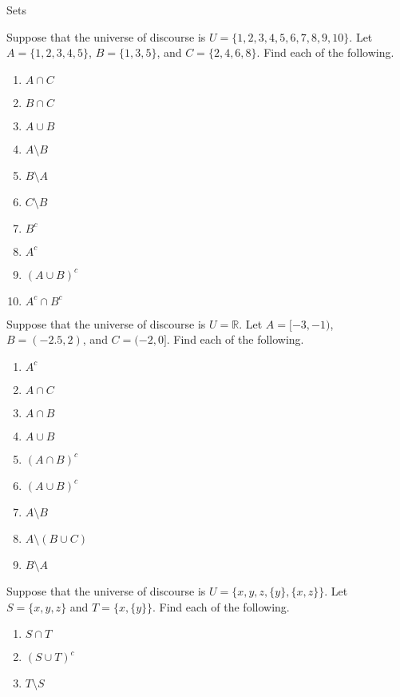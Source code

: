 \begin{section}{Sets}
\begin{problem}
Suppose that the universe of discourse is $U=\{1,2,3,4,5,6,7,8,9,10\}$.  Let $A=\{1, 2, 3, 4, 5\}$, $B=\{1, 3, 5\}$, and $C=\{2, 4, 6, 8\}$.  Find each of the following.
\begin{multicols}{2}
\begin{enumerate}[label=\textrm{(\alph*)}]
\item $A \cap C$
\item $B \cap C$
\item $A \cup B$
\item $A\setminus B$
\item $B \setminus A$
\item $C \setminus B$
\item $B^c$
\item $A^c$
\item $(A\cup B)^c$
\item $A^c\cap B^c$
\end{enumerate}
\end{multicols}
\end{problem}

\begin{problem}
Suppose that the universe of discourse is $U=\mathbb{R}$.  Let $A=[-3,-1)$, $B=(-2.5,2)$, and $C=(-2,0]$.  Find each of the following.
\begin{multicols}{2}
\begin{enumerate}[label=\textrm{(\alph*)}]
\item $A^c$
\item $A \cap C$
\item $A \cap B$
\item $A \cup B$
\item $(A\cap B)^c$
\item $(A\cup B)^c$
\item $A \setminus B$
\item $A\setminus (B \cup C)$
\item $B \setminus A$
\end{enumerate}
\end{multicols}
\end{problem}

\begin{problem}
Suppose that the universe of discourse is $U=\{x,y, z, \{y\}, \{x,z\}\}$. Let $S=\{x,y,z\}$ and $T=\{x,\{y\}\}$.  Find each of the following.  
\begin{enumerate}[label=\textrm{(\alph*)}]
\item $S \cap T$
\item $(S\cup T)^{c}$
\item $T\setminus S$
\end{enumerate}
\end{problem}


\end{section}
